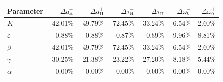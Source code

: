 \begin{tabular}{lrrrrrr}
\toprule
Parameter & $\Delta a_{\mathrm{H}}^{-}$ & $\Delta a_{\mathrm{H}}^{+}$ & $\Delta\tau_{\mathrm{H}}^{-}$ & $\Delta\tau_{\mathrm{H}}^{+}$ & $\Delta\omega_0^{-}$ & $\Delta\omega_0^{+}$ \\
\midrule
$K$ & -42.01\% & 49.79\% & 72.45\% & -33.24\% & -6.54\% & 2.60\% \\
$\varepsilon$ & 0.88\% & -0.88\% & -0.87\% & 0.89\% & -9.96\% & 8.81\% \\
$\beta$ & -42.01\% & 49.79\% & 72.45\% & -33.24\% & -6.54\% & 2.60\% \\
$\gamma$ & 30.25\% & -21.38\% & -23.22\% & 27.20\% & -8.18\% & 5.44\% \\
$\alpha$ & 0.00\% & 0.00\% & 0.00\% & 0.00\% & 0.00\% & 0.00\% \\
\bottomrule
\end{tabular}
